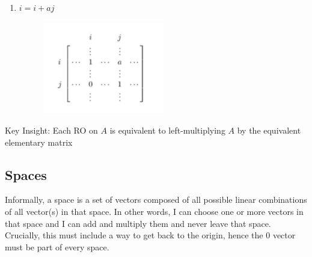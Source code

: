 \documentclass[english,course]{Notes}
\begin{document}
\begin{enumerate}
			\item $ i = i + aj$
			
\begin{figure}[H]
\centering
\includegraphics[width=0.5\textwidth]{ero3.png}
\end{figure}

\end{enumerate}
		
		\par{Key Insight: Each RO on $A$ is equivalent to left-multiplying $A$ by the equivalent elementary matrix}
	      	
		
		 
		
		\subsection{Spaces}
		
	      	
	      	\par{Informally, a space is a set of vectors composed of all possible linear combinations of all vector(s) in that space. In other words, I can choose one or more vectors in that space and I can add and multiply them and never leave that space. Crucially, this must include a way to get back to the origin, hence the $0$ vector must be part of every space.}
	      	
\end{document}
